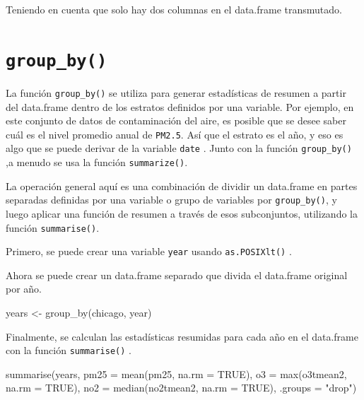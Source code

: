 \documentclass[
]{book}
\newenvironment{Shaded}{\begin{snugshade}}{\end{snugshade}}
\newcommand{\AttributeTok}[1]{\textcolor[rgb]{0.77,0.63,0.00}{#1}}
\newcommand{\ConstantTok}[1]{\textcolor[rgb]{0.00,0.00,0.00}{#1}}
\newcommand{\DecValTok}[1]{\textcolor[rgb]{0.00,0.00,0.81}{#1}}
\newcommand{\FunctionTok}[1]{\textcolor[rgb]{0.00,0.00,0.00}{#1}}
\newcommand{\NormalTok}[1]{#1}
\newcommand{\OtherTok}[1]{\textcolor[rgb]{0.56,0.35,0.01}{#1}}
\newcommand{\SpecialCharTok}[1]{\textcolor[rgb]{0.00,0.00,0.00}{#1}}
\newcommand{\StringTok}[1]{\textcolor[rgb]{0.31,0.60,0.02}{#1}}
\begin{document}
Teniendo en cuenta que solo hay dos columnas en el data.frame transmutado.

\hypertarget{group_by}{%
\section{\texorpdfstring{\texttt{group\_by()}}{group\_by()}}\label{group_by}}

La función \texttt{group\_by()} se utiliza para generar estadísticas de resumen a partir del data.frame dentro de los estratos definidos por una variable. Por ejemplo, en este conjunto de datos de contaminación del aire, es posible que se desee saber cuál es el nivel promedio anual de \texttt{PM2.5}. Así que el estrato es el año, y eso es algo que se puede derivar de la variable \texttt{date} . Junto con la función \texttt{group\_by()} ,a menudo se usa la función \texttt{summarize()}.

La operación general aquí es una combinación de dividir un data.frame en partes separadas definidas por una variable o grupo de variables por \texttt{group\_by()}, y luego aplicar una función de resumen a través de esos subconjuntos, utilizando la función \texttt{summarise()}.

Primero, se puede crear una variable \texttt{year} usando \texttt{as.POSIXlt()} .

\begin{Shaded}
\end{Shaded}

Ahora se puede crear un data.frame separado que divida el data.frame original por año.

\begin{Shaded}
\begin{Highlighting}[]
\NormalTok{years }\OtherTok{\textless{}{-}} \FunctionTok{group\_by}\NormalTok{(chicago, year)}
\end{Highlighting}
\end{Shaded}

Finalmente, se calculan las estadísticas resumidas para cada año en el data.frame con la función \texttt{summarise()} .

\begin{Shaded}
\begin{Highlighting}[]
\FunctionTok{summarise}\NormalTok{(years, }
           \AttributeTok{pm25 =} \FunctionTok{mean}\NormalTok{(pm25, }\AttributeTok{na.rm =} \ConstantTok{TRUE}\NormalTok{), }
           \AttributeTok{o3 =} \FunctionTok{max}\NormalTok{(o3tmean2, }\AttributeTok{na.rm =} \ConstantTok{TRUE}\NormalTok{), }
           \AttributeTok{no2 =} \FunctionTok{median}\NormalTok{(no2tmean2, }\AttributeTok{na.rm =} \ConstantTok{TRUE}\NormalTok{),}
           \AttributeTok{.groups =} \StringTok{"drop"}\NormalTok{)}
\end{Highlighting}
\end{Shaded}
\end{document}
